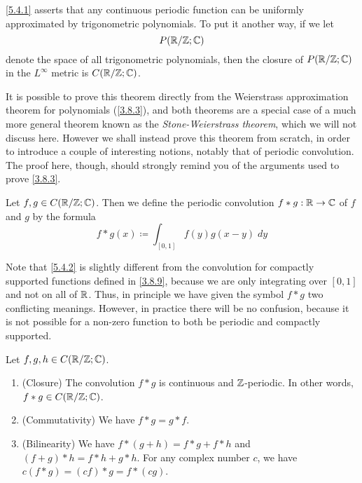 \begin{note}
  \cref{5.4.1} asserts that any continuous periodic function can be uniformly approximated by trigonometric polynomials.
  To put it another way, if we let
  \[
    P(\mathbb{R} / \mathbb{Z} ; \mathbb{C})
  \]
  denote the space of all trigonometric polynomials, then the closure of \(P(\mathbb{R} / \mathbb{Z} ; \mathbb{C})\) in the \(L^\infty\) metric is \(C(\mathbb{R} / \mathbb{Z} ; \mathbb{C})\).
\end{note}

\begin{note}
  It is possible to prove this theorem directly from the Weierstrass approximation theorem for polynomials (\cref{3.8.3}), and both theorems are a special case of a much more general theorem known as the \emph{Stone-Weierstrass theorem}, which we will not discuss here.
  However we shall instead prove this theorem from scratch, in order to introduce a couple of interesting notions, notably that of periodic convolution.
  The proof here, though, should strongly remind you of the arguments used to prove \cref{3.8.3}.
\end{note}

\begin{defn}\label{5.4.2}
  Let \(f, g \in C(\mathbb{R} / \mathbb{Z} ; \mathbb{C})\).
  Then we define the periodic convolution \(f * g : \mathbb{R} \to \mathbb{C}\) of \(f\) and \(g\) by the formula
  \[
    f * g(x) \coloneqq \int_{[0, 1]} f(y) g(x - y) \; dy
  \]
\end{defn}

\begin{rmk}\label{5.4.3}
  Note that \cref{5.4.2} is slightly different from the convolution for compactly supported functions defined in \cref{3.8.9}, because we are only integrating over \([0, 1]\) and not on all of \(\mathbb{R}\).
  Thus, in principle we have given the symbol \(f * g\) two conflicting meanings.
  However, in practice there will be no confusion, because it is not possible for a non-zero function to both be periodic and compactly supported.
\end{rmk}

\begin{lem}\label{5.4.4}
  Let \(f, g, h \in C(\mathbb{R} / \mathbb{Z} ; \mathbb{C})\).
  \begin{enumerate}
    \item (Closure)
          The convolution \(f * g\) is continuous and \(\mathbb{Z}\)-periodic.
          In other words, \(f * g \in C(\mathbb{R} / \mathbb{Z} ; \mathbb{C})\).
    \item (Commutativity)
          We have \(f * g = g * f\).
    \item (Bilinearity)
          We have \(f * (g + h) = f * g + f * h\) and \((f + g) * h = f * h + g * h\).
          For any complex number \(c\), we have \(c(f * g) = (cf) * g = f * (cg)\).
  \end{enumerate}
\end{lem}

